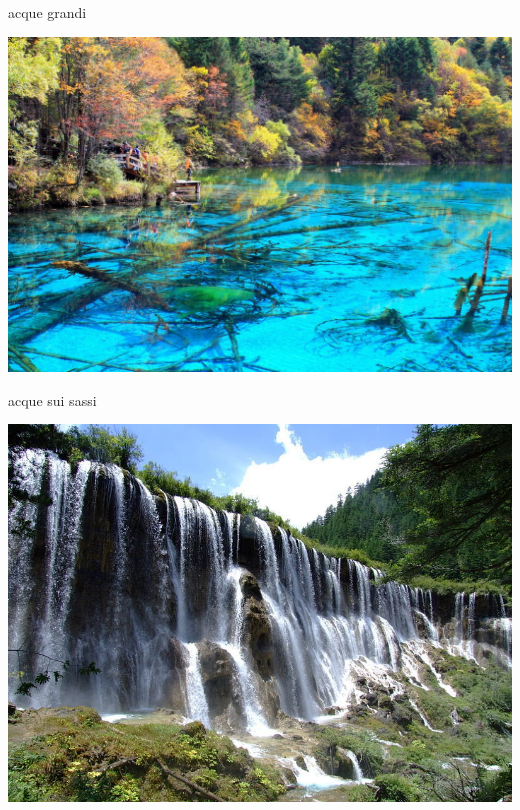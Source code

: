 \documentclass[presentation]{beamer}
\begin{document}
\begin{frame}[label={sec:org0b2c0d7}]{acque grandi}
\begin{center}
\includegraphics[width=.9\linewidth]{./immagini/lago_uomini.jpg}
\end{center}
\end{frame}
\begin{frame}[label={sec:org00233fa}]{acque sui sassi}
\begin{center}
\includegraphics[width=.9\linewidth]{./immagini/cascata_vicina.jpg}
\end{center}
\end{frame}
\end{document}
